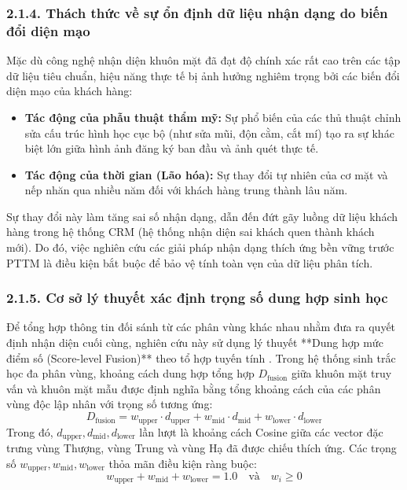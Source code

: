 \subsubsection*{2.1.4. Thách thức về sự ổn định dữ liệu nhận dạng do biến đổi diện mạo}

Mặc dù công nghệ nhận diện khuôn mặt đã đạt độ chính xác rất cao trên các tập dữ liệu tiêu chuẩn, hiệu năng thực tế bị ảnh hưởng nghiêm trọng bởi các biến đổi diện mạo của khách hàng:
\begin{itemize}
    \item \textbf{Tác động của phẫu thuật thẩm mỹ:} Sự phổ biến của các thủ thuật chỉnh sửa cấu trúc hình học cục bộ (như sửa mũi, độn cằm, cắt mí) tạo ra sự khác biệt lớn giữa hình ảnh đăng ký ban đầu và ảnh quét thực tế.
    \item \textbf{Tác động của thời gian (Lão hóa):} Sự thay đổi tự nhiên của cơ mặt và nếp nhăn qua nhiều năm đối với khách hàng trung thành lâu năm.
\end{itemize}
Sự thay đổi này làm tăng sai số nhận dạng, dẫn đến đứt gãy luồng dữ liệu khách hàng trong hệ thống CRM (hệ thống nhận diện sai khách quen thành khách mới). Do đó, việc nghiên cứu các giải pháp nhận dạng thích ứng bền vững trước PTTM là điều kiện bắt buộc để bảo vệ tính toàn vẹn của dữ liệu phân tích.

\subsubsection*{2.1.5. Cơ sở lý thuyết xác định trọng số dung hợp sinh học}

Để tổng hợp thông tin đối sánh từ các phân vùng khác nhau nhằm đưa ra quyết định nhận diện cuối cùng, nghiên cứu này sử dụng lý thuyết **Dung hợp mức điểm số (Score-level Fusion)** theo tổ hợp tuyến tính \cite{ross2003information, ross2006handbook}. Trong hệ thống sinh trắc học đa phân vùng, khoảng cách dung hợp tổng hợp $D_{\text{fusion}}$ giữa khuôn mặt truy vấn và khuôn mặt mẫu được định nghĩa bằng tổng khoảng cách của các phân vùng độc lập nhân với trọng số tương ứng:
\begin{equation}
D_{\text{fusion}} = w_{\text{upper}} \cdot d_{\text{upper}} + w_{\text{mid}} \cdot d_{\text{mid}} + w_{\text{lower}} \cdot d_{\text{lower}}
\end{equation}
Trong đó, $d_{\text{upper}}, d_{\text{mid}}, d_{\text{lower}}$ lần lượt là khoảng cách Cosine giữa các vector đặc trưng vùng Thượng, vùng Trung và vùng Hạ đã được chiếu thích ứng. Các trọng số $w_{\text{upper}}, w_{\text{mid}}, w_{\text{lower}}$ thỏa mãn điều kiện ràng buộc:
\begin{equation}
w_{\text{upper}} + w_{\text{mid}} + w_{\text{lower}} = 1.0 \quad \text{và} \quad w_i \ge 0
\end{equation}

